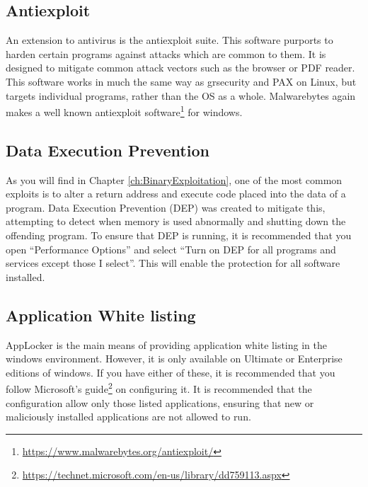 		\subsection{Antiexploit}
			An extension to antivirus is the antiexploit suite.
			This software purports to harden certain programs against attacks which are common to them.
			It is designed to mitigate common attack vectors such as the browser or PDF reader.
			This software works in much the same way as grsecurity and PAX on Linux, but targets individual programs, rather than the OS as a whole.
			Malwarebytes again makes a well known antiexploit software\footnote{\url{https://www.malwarebytes.org/antiexploit/}} for windows.
		\subsection{Data Execution Prevention}
			As you will find in Chapter \ref{ch:BinaryExploitation},
			one of the most common exploits is to alter a return address and execute code placed into the data of a program.
			Data Execution Prevention (DEP) was created to mitigate this, attempting to detect when memory is used abnormally and shutting down the offending program.
			To ensure that DEP is running, it is recommended that you open ``Performance Options'' and select ``Turn on DEP for all programs and services except those I select''.
			This will enable the protection for all software installed.
		\subsection{Application White listing}
			AppLocker is the main means of providing application white listing in the windows environment.
			However, it is only available on Ultimate or Enterprise editions of windows.
			If you have either of these, it is recommended that you follow Microsoft's guide\footnote{\url{https://technet.microsoft.com/en-us/library/dd759113.aspx}} on configuring it.
			It is recommended that the configuration allow only those listed applications,
			ensuring that new or maliciously installed applications are not allowed to run.
